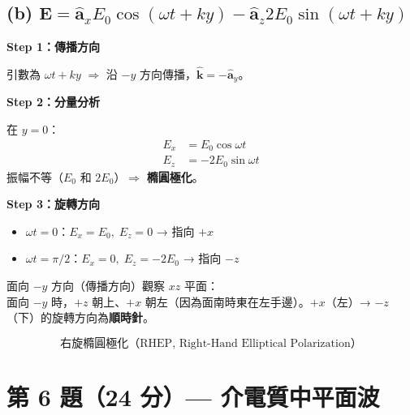 \documentclass[12pt,a4paper]{article}
\newcommand{\vE}{\mathbf{E}}
\newcommand{\vk}{\mathbf{k}}
\newcommand{\ax}{\hat{\mathbf{a}}_x}
\newcommand{\ay}{\hat{\mathbf{a}}_y}
\newcommand{\az}{\hat{\mathbf{a}}_z}
\begin{document}
\subsection*{(b) $\vE = \ax E_0\cos(\omega t + ky) - \az 2E_0\sin(\omega t + ky)$}

\begin{solutionbox}[詳解]

\textbf{Step 1：傳播方向}

引數為 $\omega t + ky$ $\Rightarrow$ 沿 $-y$ 方向傳播，$\hat{\vk} = -\ay$。

\textbf{Step 2：分量分析}

在 $y = 0$：
\begin{align*}
  E_x &= E_0\cos\omega t \\
  E_z &= -2E_0\sin\omega t
\end{align*}
振幅不等（$E_0$ 和 $2E_0$）$\Rightarrow$ \textbf{橢圓極化}。

\textbf{Step 3：旋轉方向}

\begin{itemize}
  \item $\omega t = 0$：$E_x = E_0,\; E_z = 0$ → 指向 $+x$
  \item $\omega t = \pi/2$：$E_x = 0,\; E_z = -2E_0$ → 指向 $-z$
\end{itemize}

面向 $-y$ 方向（傳播方向）觀察 $xz$ 平面：\\
面向 $-y$ 時，$+z$ 朝上、$+x$ 朝左（因為面南時東在左手邊）。$+x$（左）→ $-z$（下）的旋轉方向為\textbf{順時針}。

\[
  \boxed{\text{右旋橢圓極化（RHEP, Right-Hand Elliptical Polarization）}}
\]
\end{solutionbox}

\section{第 6 題（24 分）— 介電質中平面波}
\end{document}
